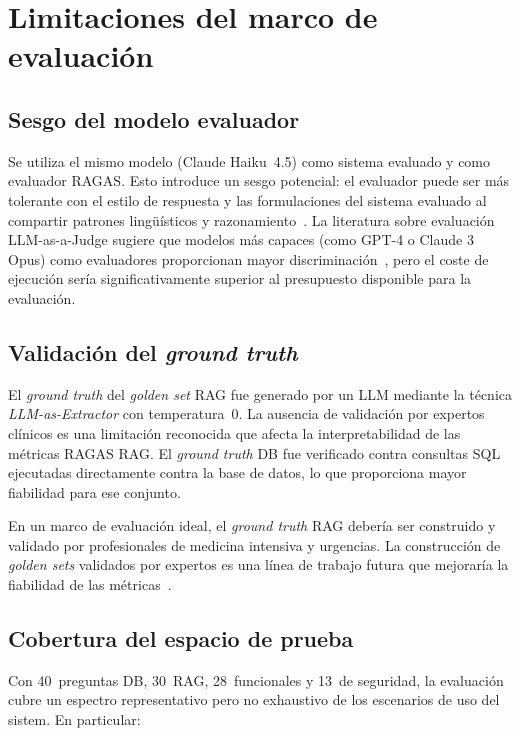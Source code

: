 \section{Limitaciones del marco de evaluación}

\subsection{Sesgo del modelo evaluador}

Se utiliza el mismo modelo (Claude Haiku~4.5) como sistema evaluado y como evaluador \ac{RAGAS}. Esto introduce un sesgo potencial: el evaluador puede ser más tolerante con el estilo de respuesta y las formulaciones del sistema evaluado al compartir patrones lingüísticos y razonamiento~\parencite{Zheng2023llmjudge}. La literatura sobre evaluación \ac{LLM}-as-a-Judge sugiere que modelos más capaces (como \acs{GPT}-4 o Claude 3 Opus) como evaluadores proporcionan mayor discriminación~\parencite{Yu2025agentjudge}, pero el coste de ejecución sería significativamente superior al presupuesto disponible para la evaluación.

\subsection{Validación del \textit{ground truth}}

El \textit{ground truth} del \textit{golden set} \ac{RAG} fue generado por un \ac{LLM} mediante la técnica \textit{LLM-as-Extractor} con temperatura~0. La ausencia de validación por expertos clínicos es una limitación reconocida que afecta la interpretabilidad de las métricas \ac{RAGAS} \ac{RAG}. El \textit{ground truth} DB fue verificado contra consultas \ac{SQL} ejecutadas directamente contra la base de datos, lo que proporciona mayor fiabilidad para ese conjunto.

En un marco de evaluación ideal, el \textit{ground truth} \ac{RAG} debería ser construido y validado por profesionales de medicina intensiva y urgencias. La construcción de \textit{golden sets} validados por expertos es una línea de trabajo futura que mejoraría la fiabilidad de las métricas~\parencite{hossain2025}.

\subsection{Cobertura del espacio de prueba}

Con 40~preguntas DB, 30~\ac{RAG}, 28~funcionales y 13~de seguridad, la evaluación cubre un espectro representativo pero no exhaustivo de los escenarios de uso del sistem. En particular:

